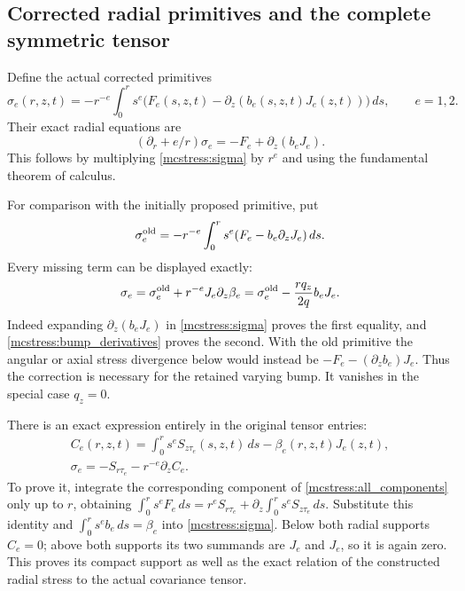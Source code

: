 \subsection{Corrected radial primitives and the complete symmetric tensor}

Define the actual corrected primitives
\begin{equation}\label{mcstress:sigma}
 \sigma_e(r,z,t)=-r^{-e}\int_0^r s^e
       \bigl(F_e(s,z,t)-\partial_z(b_e(s,z,t)J_e(z,t))\bigr)\,ds,
 \qquad e=1,2.
\end{equation}
Their exact radial equations are
\begin{equation}\label{mcstress:sigma_equation}
 (\partial_r+e/r)\sigma_e
      =-F_e+\partial_z(b_eJ_e).
\end{equation}
This follows by multiplying \eqref{mcstress:sigma} by $r^e$ and
using the fundamental theorem of calculus.

For comparison with the initially proposed primitive, put
\[
 \sigma_e^{\rm old}=-r^{-e}\int_0^r s^e
                       (F_e-b_e\partial_zJ_e)\,ds.
\]
Every missing term can be displayed exactly:
\begin{equation}\label{mcstress:primitive_correction}
 \sigma_e=\sigma_e^{\rm old}+r^{-e}J_e\partial_z\beta_e
         =\sigma_e^{\rm old}-\frac{rq_z}{2q}b_eJ_e.
\end{equation}
Indeed expanding $\partial_z(b_eJ_e)$ in
\eqref{mcstress:sigma} proves the first equality, and
\eqref{mcstress:bump_derivatives} proves the second. With the old
primitive the angular or axial stress divergence below would instead
be $-F_e-(\partial_zb_e)J_e$. Thus the correction is necessary for the
retained varying bump. It vanishes in the special case $q_z=0$.

There is an exact expression entirely in the original tensor entries:
\begin{equation}\label{mcstress:compact_flux_correction}
\begin{gathered}
 C_e(r,z,t)=\int_0^r s^eS_{z\tau_e}(s,z,t)\,ds
                                    -\beta_e(r,z,t)J_e(z,t),\\
 \sigma_e=-S_{r\tau_e}-r^{-e}\partial_zC_e.
\end{gathered}
\end{equation}
To prove it, integrate the corresponding component of
\eqref{mcstress:all_components} only up to $r$, obtaining
$\int_0^r s^eF_e\,ds=r^eS_{r\tau_e}
+\partial_z\int_0^r s^eS_{z\tau_e}\,ds$. Substitute this identity
and $\int_0^r s^e b_e\,ds=\beta_e$ into
\eqref{mcstress:sigma}. Below both radial supports $C_e=0$;
above both supports its two summands are $J_e$ and $J_e$, so it is
again zero. This proves its compact support as well as the exact
relation of the constructed radial stress to the actual covariance
tensor.

